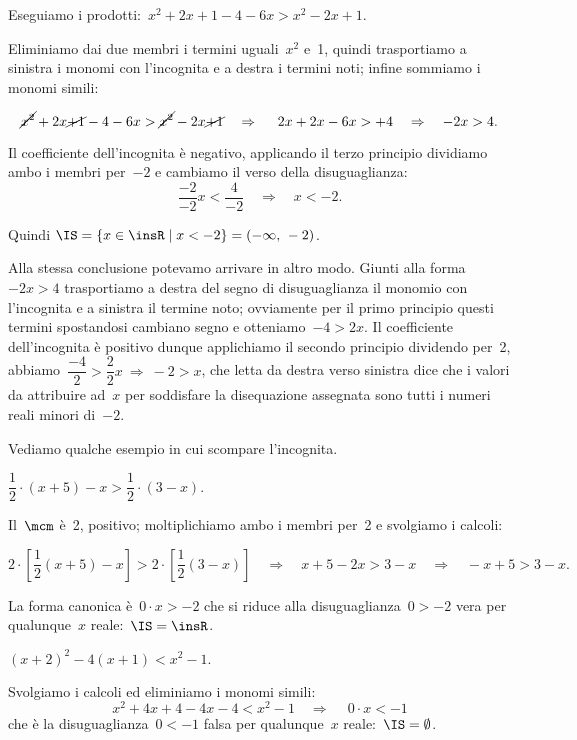 \begin{exrig}
Eseguiamo i prodotti:~$x^{2}+2x+1-4-6x>x^{2}-2x+1$.

Eliminiamo dai due membri i termini uguali~$x^{2}$ e~1,
quindi trasportiamo a sinistra i monomi con l'incognita e a
destra i termini noti; infine sommiamo i monomi simili:

\[\cancel{{x^{2}}}+2x\cancel{+1}-4-6x>\cancel{{x^{2}}}-2x\cancel{+1}\quad \Rightarrow\quad~2x+2x-6x>+4
\quad\Rightarrow\quad -2x>4.\]

Il coefficiente dell'incognita è negativo, applicando
il terzo principio dividiamo ambo i membri per~$-2$ e cambiamo il verso
della disuguaglianza:
\[\frac{-2}{-2}x<\frac{4}{-2}\quad\Rightarrow\quad x<-2.\]

\begin{center}
 
\end{center}

 Quindi $\IS=\{x\in \insR\mid x<-2\}=(-\infty\text{,~}-2)$.


Alla stessa conclusione potevamo arrivare in altro modo. Giunti alla forma~$-2x>4$ trasportiamo a destra del
segno di disuguaglianza il monomio con l'incognita e a
sinistra il termine noto; ovviamente per il primo principio
questi termini spostandosi cambiano segno e otteniamo~$-4>2x$. Il coefficiente
dell'incognita è positivo dunque applichiamo il
secondo principio dividendo per~2,
abbiamo~$\dfrac{-4}{2}>\dfrac{2}{2}x\:\Rightarrow\: -2>x$, che letta da destra verso sinistra dice che i
valori da attribuire ad~$x$ per soddisfare la disequazione assegnata sono
tutti i numeri reali minori di~$-2$.
\end{exrig}

Vediamo qualche esempio in cui scompare l'incognita.

\begin{exrig}

\begin{esempio}
$\dfrac{1}{2}\cdot (x+5)-x>\dfrac{1}{2}\cdot (3-x).$
\end{esempio}
Il~$\mcm$ è~2, positivo; moltiplichiamo ambo i membri per~2 e svolgiamo
i calcoli:

\[2\cdot \left[\frac{1}{2}(x+5)-x\right]>2\cdot
\left[\frac{1}{2}(3-x)\right]\quad\Rightarrow\quad x+5-2x>3-x\quad\Rightarrow\quad -x+5>3-x.\]

La forma canonica è~$0\cdot x>-2$ che si riduce alla disuguaglianza~$0>-2$
vera per qualunque~$x$ reale:~$\IS=\insR$.


\begin{esempio}
$(x+2)^2-4(x+1)<x^{2}-1.$
\end{esempio}
Svolgiamo i calcoli ed eliminiamo i monomi simili:
\[x^{2}+4x+4-4x-4<x^{2}-1\quad\Rightarrow\quad~0\cdot x<-1\]
che è la disuguaglianza~$0<-1$ falsa per qualunque~$x$ reale:~$\IS=\emptyset $.
\vspace*{1.05ex}
\end{exrig}

